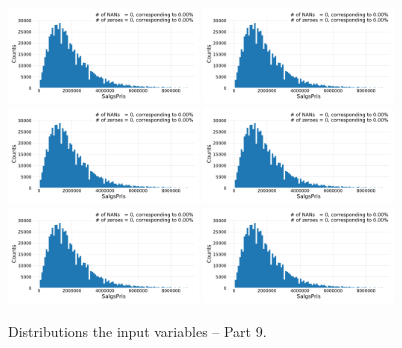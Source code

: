 \begin{figure}
  \subfloat{\qquad}
  \includegraphics[draft=false, width=0.45\textwidth, page=103, trim=15 0 15 0, clip]{figures/housing/overview_fig.pdf}\hfil
  \subfloat{\qquad}
  \includegraphics[draft=false, width=0.45\textwidth, page=104, trim=15 0 15 0, clip]{figures/housing/overview_fig.pdf}
  \subfloat{\qquad}
  \includegraphics[draft=false, width=0.45\textwidth, page=105, trim=15 0 15 0, clip]{figures/housing/overview_fig.pdf}\hfil
  \subfloat{\qquad}
  \includegraphics[draft=false, width=0.45\textwidth, page=106, trim=15 0 15 0, clip]{figures/housing/overview_fig.pdf}
  \subfloat{\qquad}
  \includegraphics[draft=false, width=0.45\textwidth, page=107, trim=15 0 15 0, clip]{figures/housing/overview_fig.pdf}\hfil
  \subfloat{\qquad}
  \includegraphics[draft=false, width=0.45\textwidth, page=108, trim=15 0 15 0, clip]{figures/housing/overview_fig.pdf}
  \caption[Distributions of the Input Variables -- Part 9]{Distributions the input variables -- Part 9.}
  \label{fig:h:variable_overview_all_9}
  \vspace{\abovecaptionskip}
\end{figure}

